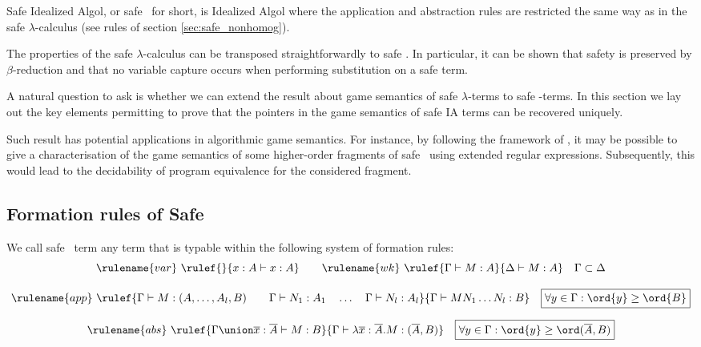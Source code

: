 Safe Idealized Algol, or safe \ialgol\ for short, is Idealized Algol
where the application and abstraction rules are restricted the same
way as in the safe $\lambda$-calculus (see rules of section
\ref{sec:safe_nonhomog}).

The properties of the safe $\lambda$-calculus can be transposed
straightforwardly to safe \ialgol. In particular, it can be shown
that safety is preserved by $\beta$-reduction and that no variable
capture occurs when performing substitution on a safe term.

A natural question to ask is whether we can extend the result about
game semantics of safe $\lambda$-terms to safe \ialgol-terms. In
this section we lay out the key elements permitting to prove that
the pointers in the game semantics of safe IA terms can be recovered
uniquely.

Such result has potential applications in algorithmic game semantics.
For instance, by following the framework of \cite{ghicamccusker00},
it may be possible to give a characterisation of the game semantics
of some higher-order fragments of safe \ialgol\ using extended
regular expressions. Subsequently, this would lead to the
decidability of program equivalence for the considered fragment.


\subsection{Formation rules of Safe \ialgol}
We call safe \ialgol\ term any term that is typable within the
following system of formation rules:
$$ \rulename{var} \   \rulef{}{x : A\vdash x : A}
\qquad  \rulename{wk} \   \rulef{\Gamma \vdash M : A}{\Delta \vdash
M : A} \quad  \Gamma \subset \Delta$$

$$ \rulename{app} \  \rulef{\Gamma \vdash M : (A,\ldots,A_l,B)
                                        \qquad \Gamma \vdash N_1 : A_1
                                        \quad \ldots \quad \Gamma \vdash N_l : A_l  }
                                   {\Gamma  \vdash M N_1 \ldots N_l : B}
                                    \quad
\mbox{\fbox{$\forall y \in \Gamma : \ord{y} \geq \ord{B}$}}$$

$$ \rulename{abs} \   \rulef{\Gamma \union \overline{x} : \overline{A} \vdash M : B}
                                   {\Gamma  \vdash \lambda \overline{x} : \overline{A} . M : (\overline{A},B)} \quad
\mbox{\fbox{$\forall y \in \Gamma : \ord{y} \geq \ord(\overline{A},B)$}}$$

